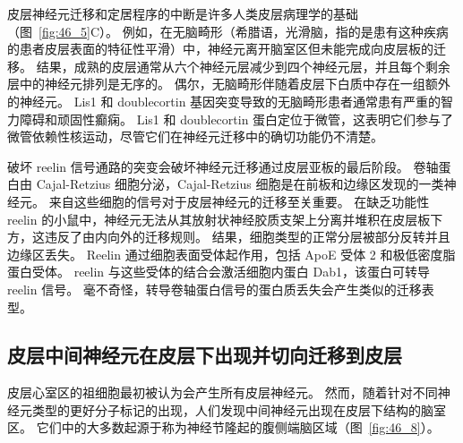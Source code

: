 皮层神经元迁移和定居程序的中断是许多人类皮层病理学的基础（图~\ref{fig:46_5}C）。
例如，在无脑畸形（希腊语，光滑脑，指的是患有这种疾病的患者皮层表面的特征性平滑）中，神经元离开脑室区但未能完成向皮层板的迁移。
结果，成熟的皮层通常从六个神经元层减少到四个神经元层，并且每个剩余层中的神经元排列是无序的。
偶尔，无脑畸形伴随着皮层下白质中存在一组额外的神经元。
Lis1 和 doublecortin 基因突变导致的无脑畸形患者通常患有严重的智力障碍和顽固性癫痫。
Lis1 和 doublecortin 蛋白定位于微管，这表明它们参与了微管依赖性核运动，尽管它们在神经元迁移中的确切功能仍不清楚。


破坏 reelin 信号通路的突变会破坏神经元迁移通过皮层亚板的最后阶段。
卷轴蛋白由 Cajal-Retzius 细胞分泌，Cajal-Retzius 细胞是在前板和边缘区发现的一类神经元。
来自这些细胞的信号对于皮层神经元的迁移至关重要。
在缺乏功能性 reelin 的小鼠中，神经元无法从其放射状神经胶质支架上分离并堆积在皮层板下方，这违反了由内向外的迁移规则。
结果，细胞类型的正常分层被部分反转并且边缘区丢失。
Reelin 通过细胞表面受体起作用，包括 ApoE 受体 2 和极低密度脂蛋白受体。
reelin 与这些受体的结合会激活细胞内蛋白 Dab1，该蛋白可转导 reelin 信号。
毫不奇怪，转导卷轴蛋白信号的蛋白质丢失会产生类似的迁移表型。



\subsection{皮层中间神经元在皮层下出现并切向迁移到皮层}

皮层心室区的祖细胞最初被认为会产生所有皮层神经元。
然而，随着针对不同神经元类型的更好分子标记的出现，人们发现中间神经元出现在皮层下结构的脑室区。
它们中的大多数起源于称为神经节隆起的腹侧端脑区域（图~\ref{fig:46_8}）。


